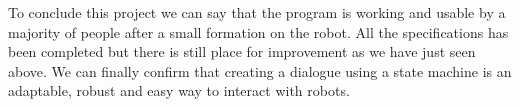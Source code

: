 To conclude this project we can say that the program is working and usable by a majority of people after a small formation on the robot. All the specifications has been completed but there is still place for improvement as we have just seen above. We can finally confirm that creating a dialogue using a state machine is an adaptable, robust and easy way to interact with robots.
